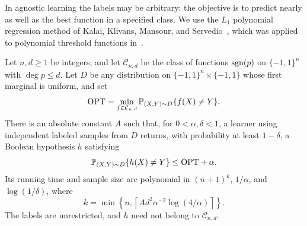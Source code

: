 In agnostic learning the labels may be arbitrary: the objective is to
predict nearly as well as the best function in a specified class.
We use the $L_1$ polynomial regression method of Kalai, Klivans,
Mansour, and Servedio~\cite{KKMS2008}, which was applied to polynomial
threshold functions in~\cite[Section~8]{DRST2014}.

\begin{corollary}\label{cor:agnostic-learning}
Let $n,d\ge1$ be integers, and let $\mathcal C_{n,d}$ be the class of
functions $\operatorname{sgn}(p)$ on $\{-1,1\}^n$ with $\deg p\le d$.
Let $D$ be any distribution on $\{-1,1\}^n\times\{-1,1\}$ whose first
marginal is uniform, and set
\[
 \mathrm{OPT}=\min_{f\in\mathcal C_{n,d}}\mathbb P_{(X,Y)\sim D}\{f(X)\ne Y\}.
\]
There is an absolute constant $A$ such that, for $0<\alpha,\delta<1$,
a learner using independent labeled samples from $D$ returns, with
probability at least $1-\delta$, a Boolean hypothesis $h$ satisfying
\[
 \mathbb P_{(X,Y)\sim D}\{h(X)\ne Y\}\le\mathrm{OPT}+\alpha.
\]
Its running time and sample size are polynomial in
$(n+1)^k$, $1/\alpha$, and $\log(1/\delta)$, where
\[
 k=\min\left\{n,\left\lceil A d^2\alpha^{-2}\log(4/\alpha)\right\rceil\right\}.
\]
The labels are unrestricted, and $h$ need not belong to $\mathcal C_{n,d}$.
\end{corollary}

